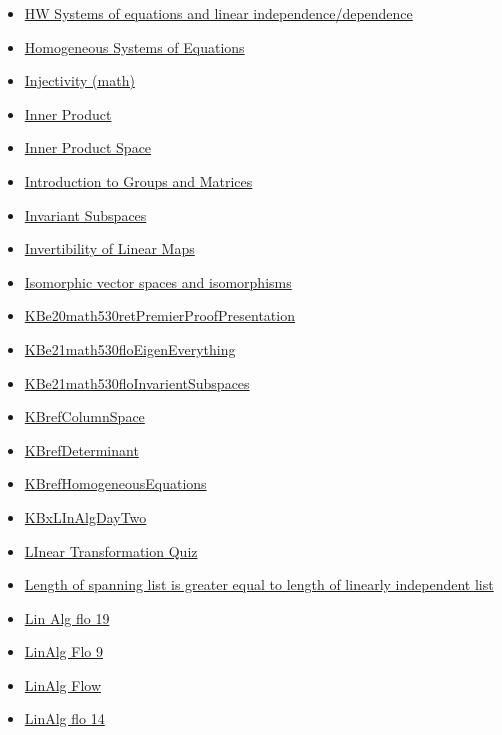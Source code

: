 \documentclass[11pt]{article}
\begin{document}
\begin{itemize}
\begin{itemize}
\item \href{math530/KBe20math530retSysEquationsLinearInDependence.org}{HW Systems of equations and linear independence/dependence}
\item \href{math530/KBrefHomogeneousSystemsOfEquations.org}{Homogeneous Systems of Equations}
\item \href{math530/KBrefInjective.org}{Injectivity (math)}
\item \href{math530/KBrefInnerProduct.org}{Inner Product}
\item \href{math530/KBrefInnerProductSpaces.org}{Inner Product Space}
\item \href{math530/KBxGroupAndMatricesIntro.org}{Introduction to Groups and Matrices}
\item \href{math530/KBrefInvariantSubspaces.org}{Invariant Subspaces}
\item \href{math530/KBrefInvertibleLinearMaps.org}{Invertibility of Linear Maps}
\item \href{math530/KBrefIsomorphicVectorSpace.org}{Isomorphic vector spaces and isomorphisms}
\item \href{math530/KBe20math530retPremierProofPresentation.org}{KBe20math530retPremierProofPresentation}
\item \href{math530/KBe21math530floEigenEverything.org}{KBe21math530floEigenEverything}
\item \href{math530/KBe21math530floInvarientSubspaces.org}{KBe21math530floInvarientSubspaces}
\item \href{math530/KBrefColumnSpace.org}{KBrefColumnSpace}
\item \href{math530/KBrefDeterminant.org}{KBrefDeterminant}
\item \href{math530/KBrefHomogeneousEquations.org}{KBrefHomogeneousEquations}
\item \href{math530/KBxLInAlgDayTwo.org}{KBxLInAlgDayTwo}
\item \href{math530/KBe20math530retLinearTransformationQuiz.org}{LInear Transformation Quiz}
\item \href{math530/KBe20math530retProofSpanningListLongerThanLinearIndependent.org}{Length of spanning list is greater equal to length of linearly independent list}
\item \href{math530/KBe20math530flo19.org}{Lin Alg flo 19}
\item \href{math530/KBe20math530flo9.org}{LinAlg Flo 9}
\item \href{math530/KBe2020math530flo3.org}{LinAlg Flow}
\item \href{math530/KBe20math530flo14.org}{LinAlg flo 14}

\end{itemize}
\end{itemize}
\end{document}
